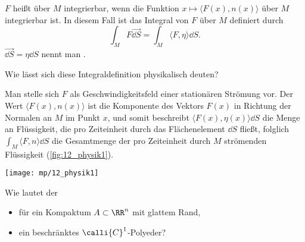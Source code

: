 \begin{antwort}
  $F$ heißt über $M$ integrierbar, wenn die Funktion 
  $x\mapsto \langle F(x), n(x) \rangle$ über $M$ integrierbar ist. 
  In diesem Fall ist das Integral von $F$ über $M$ definiert durch 
  \[
  \boxed{
    \int_M F \overrightarrow{\dd S} = 
    \int_M \langle F, \eta \rangle \dd S. 
  }
  \]
  $\overrightarrow{\dd S}=\eta\dd S$ nennt man 
  .
  \AntEnd
\end{antwort} 

\begin{frage}
  Wie lässt sich diese Integraldefinition physikalisch deuten?
\end{frage}

\begin{antwort}
  Man stelle sich $F$ als Geschwindigkeitsfeld
  einer stationären Strömung 
  vor. Der Wert $\langle F(x), n(x) \rangle$ ist die Komponente des Vektors 
  $F(x)$ in Richtung der Normalen an $M$ im Punkt $x$, und somit  
  beschreibt $\langle F(x), \eta(x) \rangle \dd S$ die Menge  
  an Flüssigkeit, die pro Zeiteinheit durch das Flächenelement $\dd S$ 
  fließt, folglich $\int_M \langle F, n \rangle \dd S$ 
  die Gesamtmenge der pro Zeiteinheit durch $M$ strömenden Flüssigkeit 
  (\sieheAbbildung\ref{fig:12_physik1}). 
  \AntEnd
  
  \begin{center}
    \texttt{[image: mp/12\_physik1]}
    \label{fig:12_physik1}
  \end{center}

\end{antwort}



\begin{frage}
  Wie lautet der  
  \begin{itemize}[2mm]
  \item[\desc{a}] für ein Kompaktum $A\subset\RR^n$ mit glattem Rand,\\[-3mm]
  \item[\desc{b}] ein beschränktes $\calli{C}^1$-Polyeder?
  \end{itemize}
\end{frage}

